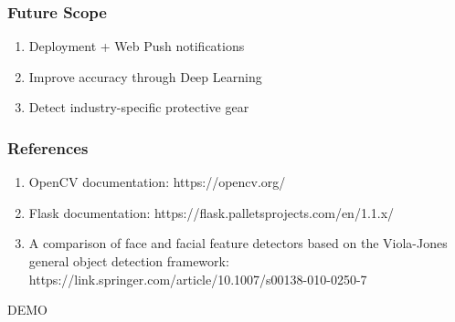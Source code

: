 \documentclass[14pt]{beamer}
\begin{document}
\begin{frame}
    \frametitle{Future Scope}
    \begin{enumerate}
        \item Deployment + Web Push notifications
        \item Improve accuracy through Deep Learning
        \item Detect industry-specific protective gear
    \end{enumerate}
\end{frame}

\begin{frame}
    \frametitle{References}
    \begin{enumerate}
        \item OpenCV documentation: 
        https://opencv.org/
        \item Flask documentation: 
        https://flask.palletsprojects.com/en/1.1.x/
        \item A comparison of face and facial feature detectors based on the Viola-Jones general object detection framework: 
        https://link.springer.com/article/10.1007/s00138-010-0250-7
    \end{enumerate}
\end{frame}

\begin{frame}
    DEMO
\end{frame}
\end{document}

